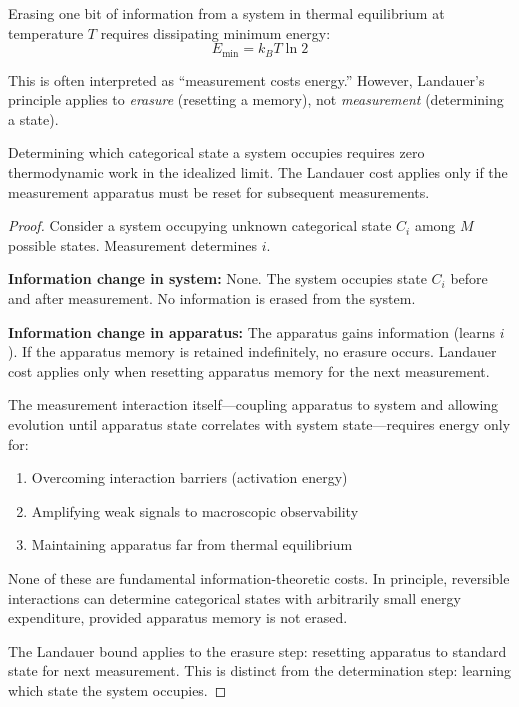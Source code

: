 \begin{theorem}
\label{thm:landauer}
Erasing one bit of information from a system in thermal equilibrium at temperature $T$ requires dissipating minimum energy:
\begin{equation}
E_{\min} = k_B T \ln 2
\end{equation}
\end{theorem}

This is often interpreted as ``measurement costs energy.'' However, Landauer's principle applies to \textit{erasure} (resetting a memory), not \textit{measurement} (determining a state).

\begin{proposition}
\label{prop:zero_cost}
Determining which categorical state a system occupies requires zero thermodynamic work in the idealized limit. The Landauer cost applies only if the measurement apparatus must be reset for subsequent measurements.
\end{proposition}

\begin{proof}
Consider a system occupying unknown categorical state $C_i$ among $M$ possible states. Measurement determines $i$.

\textbf{Information change in system:} None. The system occupies state $C_i$ before and after measurement. No information is erased from the system.

\textbf{Information change in apparatus:} The apparatus gains information (learns $i$). If the apparatus memory is retained indefinitely, no erasure occurs. Landauer cost applies only when resetting apparatus memory for the next measurement.

The measurement interaction itself—coupling apparatus to system and allowing evolution until apparatus state correlates with system state—requires energy only for:
\begin{enumerate}
\item Overcoming interaction barriers (activation energy)
\item Amplifying weak signals to macroscopic observability
\item Maintaining apparatus far from thermal equilibrium
\end{enumerate}

None of these are fundamental information-theoretic costs. In principle, reversible interactions can determine categorical states with arbitrarily small energy expenditure, provided apparatus memory is not erased.

The Landauer bound applies to the erasure step: resetting apparatus to standard state for next measurement. This is distinct from the determination step: learning which state the system occupies.
\end{proof}

